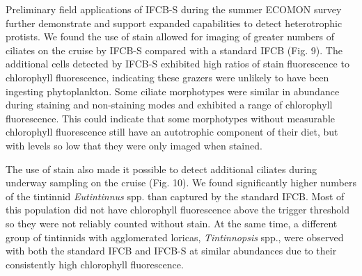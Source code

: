 Preliminary field applications of IFCB-S during the summer ECOMON survey further demonstrate and
support expanded capabilities to detect heterotrophic protists. We found the use of stain allowed for
imaging of greater numbers of ciliates on the cruise by IFCB-S compared with a standard IFCB (Fig. 9). The additional cells detected by IFCB-S exhibited high ratios of stain fluorescence to chlorophyll fluorescence, indicating these grazers were unlikely to have been ingesting phytoplankton. Some ciliate morphotypes were similar in abundance during staining and non-staining modes and exhibited a range of chlorophyll fluorescence. This could indicate that some morphotypes without measurable chlorophyll fluorescence still have an autotrophic component of their diet, but with levels so low that they were only imaged when stained.

The use of stain also made it possible to detect additional ciliates during underway sampling on the
cruise (Fig. 10). We found significantly higher numbers of the tintinnid \textit{Eutintinnus} spp. than captured by the standard IFCB. Most of this population did not have chlorophyll fluorescence above the trigger threshold so they were not reliably counted without stain. At the same time, a different group of tintinnids with agglomerated loricas, \textit{Tintinnopsis} spp., were observed with both the standard IFCB and IFCB-S at similar abundances due to their consistently high chlorophyll fluorescence.

